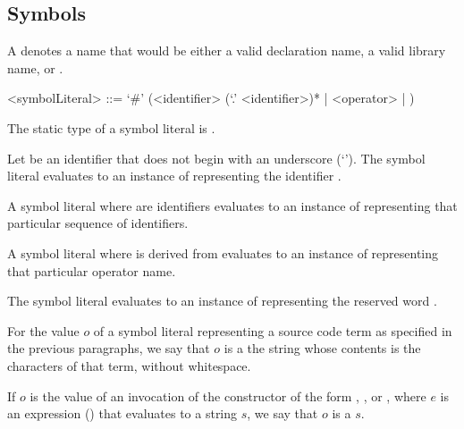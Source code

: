 \documentclass[makeidx]{article}
\begin{document}
{\subsection{Symbols}

\LMHash{}%
A 
denotes a name that would be either
a valid declaration name, a valid library name, or \VOID.

\begin{grammar}
<symbolLiteral> ::=
  `#' (<identifier> (`.' <identifier>)* | <operator> | \VOID)
\end{grammar}

\LMHash{}%
The static type of a symbol literal is .

\LMHash{}%
Let \id{} be an identifier that does not begin with an underscore
(`\code{\_}').
The symbol literal \code{\#\id}
evaluates to an instance of 
representing the identifier \id.

\LMHash{}%
A symbol literal 
where  are identifiers
evaluates to an instance of 
representing that particular sequence of identifiers.

\LMHash{}%
A symbol literal \code{\#\op}
where \op{} is derived from 
evaluates to an instance of 
representing that particular operator name.

\LMHash{}%
The symbol literal 
evaluates to an instance of 
representing the reserved word \VOID.

\LMHash{}%
For the value $o$ of a symbol literal representing a source code term
as specified in the previous paragraphs, we say that $o$ is a
the string whose contents is the characters of that term, without whitespace.


\LMHash{}%
If $o$ is the value of an invocation of the  constructor
of the form
, ,
or ,
where $e$ is an expression
()
that evaluates to a string $s$,
we say that $o$ is a  $s$.

}
\end{document}
